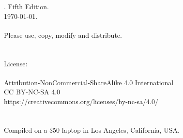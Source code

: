 	\null \vfill
	. Fifth Edition. \\
		\today. \\ \\
	\noindent%
		Please use, copy, modify and distribute.\\ \\ \\
	\noindent
		License:\\ \\
		Attribution-NonCommercial-ShareAlike 4.0 International\\
		CC BY-NC-SA 4.0\\
		https://creativecommons.org/licenses/by-nc-sa/4.0/\\ 	\\ \\ 

	\noindent Compiled on a \$50 laptop in Los Angeles, California, USA.
	\clearpage
